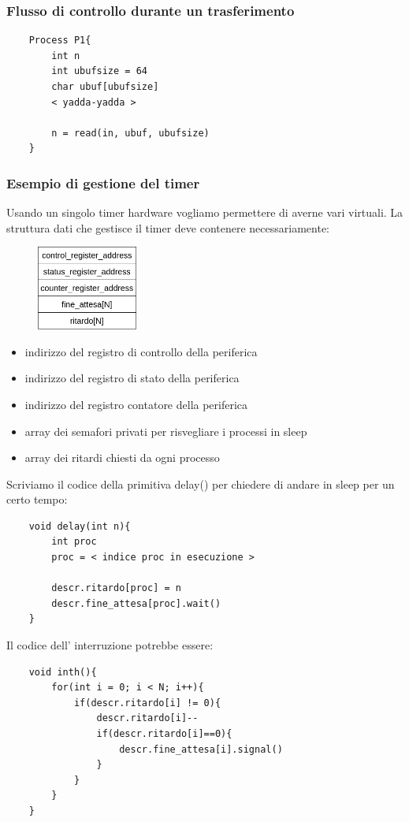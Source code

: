 \subsubsection{Flusso di controllo durante un trasferimento}
\begin{verbatim}
    Process P1{
        int n
        int ubufsize = 64
        char ubuf[ubufsize]
        < yadda-yadda >

        n = read(in, ubuf, ubufsize)
    }
\end{verbatim}

\subsubsection{Esempio di gestione del timer}
Usando un singolo timer hardware vogliamo permettere di averne vari virtuali.
La struttura dati che gestisce il timer deve contenere necessariamente:

\begin{figure}[H]
    \centering
    \includegraphics[width=125px]{images/10_Gestione_delle_periferiche/timer_descriptor.png}
\end{figure}

\begin{itemize}
    \item indirizzo del registro di controllo della periferica
    \item indirizzo del registro di stato della periferica
    \item indirizzo del registro contatore della periferica
    \item array dei semafori privati per risvegliare i processi in sleep
    \item array dei ritardi chiesti da ogni processo
\end{itemize}

Scriviamo il codice della primitiva delay() per chiedere di andare in sleep per un certo tempo:
\begin{verbatim}
    void delay(int n){
        int proc
        proc = < indice proc in esecuzione >
        
        descr.ritardo[proc] = n
        descr.fine_attesa[proc].wait()
    }
\end{verbatim}
Il codice dell' interruzione potrebbe essere:    
\begin{verbatim}
    void inth(){
        for(int i = 0; i < N; i++){
            if(descr.ritardo[i] != 0){
                descr.ritardo[i]--
                if(descr.ritardo[i]==0){
                    descr.fine_attesa[i].signal()
                }
            }
        }
    }
\end{verbatim}

